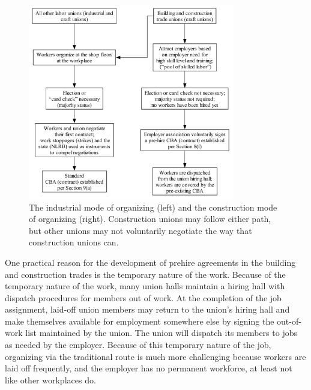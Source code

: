 \documentclass[12pt]{article}
\newcommand{\imageWidth}{0.8\textwidth}
\begin{document}
\begin{figure}[ht]
  \centering
  \includegraphics[width=\imageWidth]{images/organizing_paths}
  \captionsetup{justification=centering, singlelinecheck=false, margin=2cm}
  \caption[Union Organizing Paths]{The industrial mode of organizing (left) and the construction mode of organizing (right). Construction unions may follow either path, but other unions may not voluntarily negotiate the way that construction unions can.}
  \label{fig:organizing_paths}
\end{figure}

One practical reason for the development of prehire agreements in the building and construction trades is the temporary nature of the work. Because of the temporary nature of the work, many union halls maintain a hiring hall with dispatch procedures for members out of work. At the completion of the job assignment, laid-off union members may return to the union’s hiring hall and make themselves available for employment somewhere else by signing the out-of-work list maintained by the union. The union will dispatch its members to jobs as needed by the employer. Because of this temporary nature of the job, organizing via the traditional route is much more challenging because workers are laid off frequently, and the employer has no permanent workforce, at least not like other workplaces do. 
\end{document}

